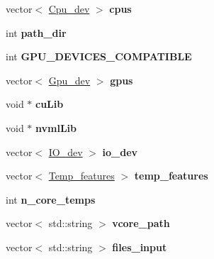 \begin{DoxyCompactItemize}
\item 
\mbox{\label{structhw__conf_ac24186e87992dc8f0b4f0ed7553be3e4}} 
vector$<$ \mbox{\hyperlink{structcpu__dev}{Cpu\+\_\+dev}} $>$ {\bfseries cpus}
\item 
\mbox{\label{structhw__conf_aa7023983ec2accadd4888ebad7e591b9}} 
int {\bfseries path\+\_\+dir}
\item 
\mbox{\label{structhw__conf_a7604d484e549e9674c6dd481fe97a29f}} 
int {\bfseries G\+P\+U\+\_\+\+D\+E\+V\+I\+C\+E\+S\+\_\+\+C\+O\+M\+P\+A\+T\+I\+B\+LE}
\item 
\mbox{\label{structhw__conf_a5b129d0262e8a121236403dd9feefe1a}} 
vector$<$ \mbox{\hyperlink{structGpu__dev}{Gpu\+\_\+dev}} $>$ {\bfseries gpus}
\item 
\mbox{\label{structhw__conf_a7a93a1abe428c02facb5072ec39224af}} 
void $\ast$ {\bfseries cu\+Lib}
\item 
\mbox{\label{structhw__conf_a3d9aa1591226f5b5ce8217e67d90b2c7}} 
void $\ast$ {\bfseries nvml\+Lib}
\item 
\mbox{\label{structhw__conf_a1c3e333222c8608ccb7c0f02ee6eee5e}} 
vector$<$ \mbox{\hyperlink{structio__dev}{I\+O\+\_\+dev}} $>$ {\bfseries io\+\_\+dev}
\item 
\mbox{\label{structhw__conf_a8516a407c36fe15fd86129e815ea93a0}} 
vector$<$ \mbox{\hyperlink{structtemp__features}{Temp\+\_\+features}} $>$ {\bfseries temp\+\_\+features}
\item 
\mbox{\label{structhw__conf_a56100b613a4fabcf4c77a564d37bd0d4}} 
int {\bfseries n\+\_\+core\+\_\+temps}
\item 
\mbox{\label{structhw__conf_aae2e7d9d4ae679d8eb3208cbabe9905a}} 
vector$<$ std\+::string $>$ {\bfseries vcore\+\_\+path}
\item 
\mbox{\label{structhw__conf_ad7faf791a25b9af0516714764f08a8c8}} 
vector$<$ std\+::string $>$ {\bfseries files\+\_\+input}
\item 

\end{DoxyCompactItemize}
